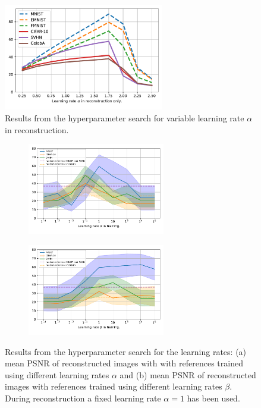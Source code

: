 \begin{figure}
	\centering
	\includegraphics[width=7cm,trim= 10 20 10 0]{data/lr-alpha-rec-all.pdf}
	\caption{Results from the hyperparameter search for variable learning rate $\alpha$ in reconstruction.}
	\label{hyperparam-all}
\end{figure}

\begin{figure}
	\begin{subfigure}{.49\textwidth}
		\centering
		\includegraphics[width=6cm, trim= 0 20 0 0]{data/lr-alpha-log-plot-big.pdf}
		\caption{}
		\label{hyperparam-log-a}
	\end{subfigure}
	\begin{subfigure}{.49\textwidth}
		\centering
		\includegraphics[width=6cm, trim= 0 20 0 0]{data/lr-beta-log-plot-big.pdf}
		\caption{}
		\label{hyperparam-log-b}
	\end{subfigure}
	\caption{Results from the hyperparameter search for the learning rates: (a) mean PSNR of reconstructed images with  with references trained using different learning rates $\alpha$ and (b) mean PSNR of reconstructed images with references trained using different learning rates $\beta$. During reconstruction a fixed learning rate $\alpha=1$ has been used.}
\end{figure}

